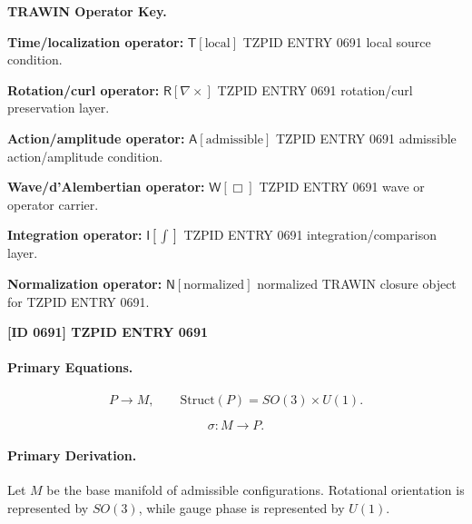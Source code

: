 \par\vspace{0.45\baselineskip}
\noindent\begin{minipage}[t]{\linewidth}
\begingroup
\small
\raggedright
\textbf{TRAWIN Operator Key.}\par
\noindent\textbf{Time/localization operator:} $\mathsf{T}\!\left[\mathrm{local}\right]$ TZPID ENTRY 0691 local source condition.\par
\noindent\textbf{Rotation/curl operator:} $\mathsf{R}\!\left[\nabla\times\right]$ TZPID ENTRY 0691 rotation/curl preservation layer.\par
\noindent\textbf{Action/amplitude operator:} $\mathsf{A}\!\left[\mathrm{admissible}\right]$ TZPID ENTRY 0691 admissible action/amplitude condition.\par
\noindent\textbf{Wave/d'Alembertian operator:} $\mathsf{W}\!\left[\Box\right]$ TZPID ENTRY 0691 wave or operator carrier.\par
\noindent\textbf{Integration operator:} $\mathsf{I}\!\left[\int\right]$ TZPID ENTRY 0691 integration/comparison layer.\par
\noindent\textbf{Normalization operator:} $\mathsf{N}\!\left[\mathrm{normalized}\right]$ normalized TRAWIN closure object for TZPID ENTRY 0691.\par
\endgroup
\end{minipage}

\clearpage
\noindent\textbf{[ID 0691] TZPID ENTRY 0691}\par
\vspace{0.35em}
\begingroup\small
\paragraph{Primary Equations.}
\begin{equation}
P \longrightarrow M,
\qquad
\mathrm{Struct}(P)=SO(3)\times U(1).
\end{equation}

\begin{equation}
\sigma:M\longrightarrow P.
\end{equation}

\paragraph{Primary Derivation.}
Let $M$ be the base manifold of admissible configurations. Rotational orientation is represented by $SO(3)$, while gauge phase is represented by $U(1)$.

